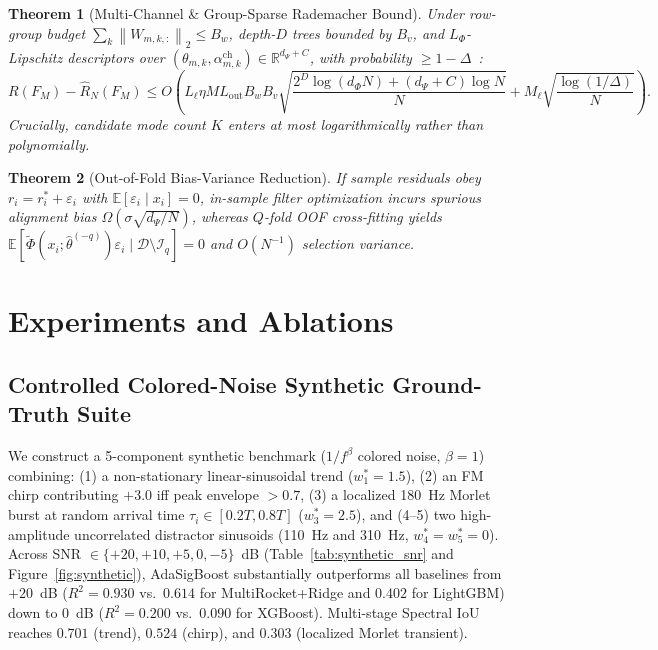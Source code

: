 \documentclass[10pt]{article}
\newtheorem{theorem}{Theorem}
\newcommand{\R}{\mathbb{R}}
\newcommand{\E}{\mathbb{E}}
\newcommand{\norm}[1]{\left\lVert #1 \right\rVert}
\begin{document}
\begin{theorem}[Multi-Channel \& Group-Sparse Rademacher Bound]
\label{thm:rad}
Under row-group budget $\sum_k \norm{W_{m,k,:}}_2 \le B_w$, depth-$D$ trees bounded by $B_v$, and $L_\Phi$-Lipschitz descriptors over $(\theta_{m,k}, \alpha_{m,k}^{\mathrm{ch}}) \in \R^{d_\Psi + C}$, with probability $\ge 1 - \Delta$~\citep{maurer2016vector}:
\[
    R(F_M) - \hat{R}_N(F_M) \le O\!\left(L_\ell \eta M L_{\mathrm{out}} B_w B_v \sqrt{\frac{2^D\log(d_\Phi N) + (d_\Psi + C)\log N}{N}} + M_\ell\sqrt{\frac{\log(1/\Delta)}{N}}\right).
\]
Crucially, candidate mode count $K$ enters at most logarithmically rather than polynomially.
\end{theorem}

\begin{theorem}[Out-of-Fold Bias-Variance Reduction]
\label{thm:oof}
If sample residuals obey $r_i = r_i^* + \varepsilon_i$ with $\E[\varepsilon_i \mid x_i]=0$, in-sample filter optimization incurs spurious alignment bias $\Omega(\sigma\sqrt{d_\Psi/N})$, whereas $Q$-fold OOF cross-fitting yields $\E[\tilde{\Phi}(x_i; \hat{\theta}^{(-q)})\varepsilon_i \mid \mathcal{D}\setminus\mathcal{I}_q] = 0$ and $O(N^{-1})$ selection variance.
\end{theorem}

\section{Experiments and Ablations}
\label{sec:exp}

\subsection{Controlled Colored-Noise Synthetic Ground-Truth Suite}
We construct a 5-component synthetic benchmark ($1/f^\beta$ colored noise, $\beta=1$) combining: (1) a non-stationary linear-sinusoidal trend ($w_1^*=1.5$), (2) an FM chirp contributing $+3.0$ iff peak envelope $>0.7$, (3) a localized 180~Hz Morlet burst at random arrival time $\tau_i \in [0.2T, 0.8T]$ ($w_3^*=2.5$), and (4--5) two high-amplitude uncorrelated distractor sinusoids (110~Hz and 310~Hz, $w_4^*=w_5^*=0$). Across SNR $\in \{+20, +10, +5, 0, -5\}$~dB (Table~\ref{tab:synthetic_snr} and Figure~\ref{fig:synthetic}), AdaSigBoost substantially outperforms all baselines from $+20$~dB ($R^2 = 0.930$ vs.\ $0.614$ for MultiRocket+Ridge and $0.402$ for LightGBM) down to $0$~dB ($R^2 = 0.200$ vs.\ $0.090$ for XGBoost). Multi-stage Spectral IoU reaches $0.701$ (trend), $0.524$ (chirp), and $0.303$ (localized Morlet transient).
\end{document}
